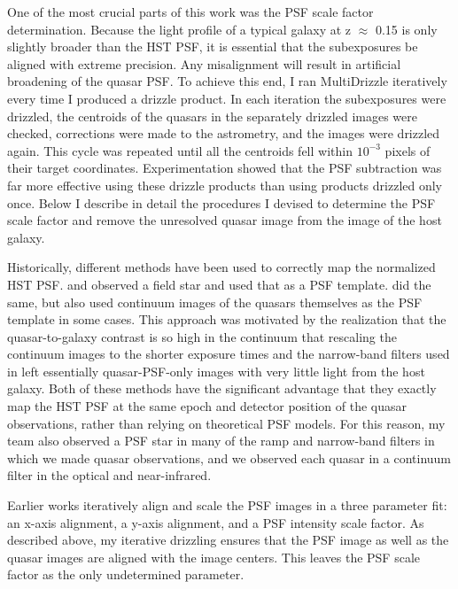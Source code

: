 One of the most crucial parts of this work was the PSF scale factor determination. Because the light profile of a typical galaxy at z $\approx$ 0.15 is only slightly broader than the HST PSF, it is essential that the subexposures be aligned with extreme precision. Any misalignment will result in artificial broadening of the quasar PSF. To achieve this end, I ran MultiDrizzle iteratively every time I produced a drizzle product. In each iteration the subexposures were drizzled, the centroids of the quasars in the separately drizzled images were checked, corrections were made to the astrometry, and the images were drizzled again. This cycle was repeated until all the centroids fell within $10^{-3}$ pixels of their target coordinates. Experimentation showed that the PSF subtraction was far more effective using these drizzle products than using products drizzled only once. Below I describe in detail the procedures I devised to determine the PSF scale factor and remove the unresolved quasar image from the image of the host galaxy.



Historically, different methods have been used to correctly map the normalized HST PSF. \cite{Bahcall} and \cite{McLeod} observed a field star and used that as a PSF template. \cite{Bennert} did the same, but also used continuum images of the quasars themselves as the PSF template in some cases. This approach was motivated by the realization that the quasar-to-galaxy contrast is so high in the continuum that rescaling the \cite{Bahcall} continuum images to the shorter exposure times and the narrow-band filters used in \cite{Bennert} left essentially quasar-PSF-only images with very little light from the host galaxy. Both of these methods have the significant advantage that they exactly map the HST PSF at the same epoch and detector position of the quasar observations, rather than relying on theoretical PSF models. For this reason, my team also observed a PSF star in many of the ramp and narrow-band filters in which we made quasar observations, and we observed each quasar in a continuum filter in the optical and near-infrared.

Earlier works \citep[e.g.][]{Bahcall} iteratively align and scale the PSF images in a three parameter fit: an x-axis alignment, a y-axis alignment, and a PSF intensity scale factor. As described above, my iterative drizzling ensures that the PSF image as well as the quasar images are aligned with the image centers. This leaves the PSF scale factor as the only undetermined parameter.

